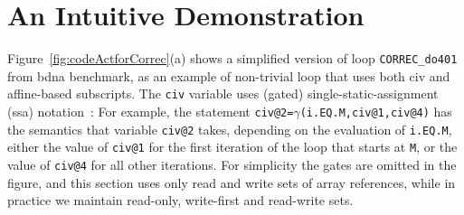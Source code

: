 \documentclass{sig-alternate}
\begin{document}





\section{An Intuitive Demonstration}
\label{Intro:RelAppLim}


Figure~\ref{fig:codeActforCorrec}(a) shows a simplified version of
loop {\tt CORREC\_do401} from {\sc bdna} benchmark, %
as an example of non-trivial loop that uses both {\sc civ} and affine-based
subscripts.   The {\tt civ} variable uses (gated) 
single-static-assignment ({\sc ssa}) notation~\cite{GatedSSA}:
%
For example, the statement {\tt civ@2=$\gamma$(i.EQ.M,civ@1,civ@4)}
has the semantics that variable {\tt civ@2} takes, depending 
on the evaluation of {\tt i.EQ.M}, either the value of {\tt civ@1} for 
the first iteration of the loop that starts at {\tt M}, or the value of 
{\tt civ@4} for all other iterations. For simplicity the gates are
omitted in the figure, and this section uses only read and write sets 
of array references, while in practice we maintain read-only, 
write-first and read-write sets. 
\end{document}

